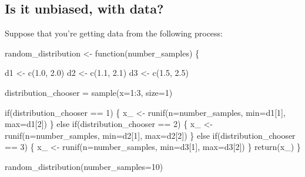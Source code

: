 \documentclass[
  letterpaper,
  DIV=11,
  numbers=noendperiod]{scrreprt}
\newenvironment{Shaded}{\begin{snugshade}}{\end{snugshade}}
\newcommand{\AttributeTok}[1]{\textcolor[rgb]{0.40,0.45,0.13}{#1}}
\newcommand{\ControlFlowTok}[1]{\textcolor[rgb]{0.00,0.23,0.31}{#1}}
\newcommand{\DecValTok}[1]{\textcolor[rgb]{0.68,0.00,0.00}{#1}}
\newcommand{\FloatTok}[1]{\textcolor[rgb]{0.68,0.00,0.00}{#1}}
\newcommand{\FunctionTok}[1]{\textcolor[rgb]{0.28,0.35,0.67}{#1}}
\newcommand{\NormalTok}[1]{\textcolor[rgb]{0.00,0.23,0.31}{#1}}
\newcommand{\OtherTok}[1]{\textcolor[rgb]{0.00,0.23,0.31}{#1}}
\newcommand{\SpecialCharTok}[1]{\textcolor[rgb]{0.37,0.37,0.37}{#1}}
\begin{document}
\subsection{Is it unbiased, with data?}\label{is-it-unbiased-with-data}

Suppose that you're getting data from the following process:

\begin{Shaded}
\begin{Highlighting}[]
\NormalTok{random\_distribution }\OtherTok{\textless{}{-}} \ControlFlowTok{function}\NormalTok{(number\_samples) \{ }
  
\NormalTok{  d1 }\OtherTok{\textless{}{-}} \FunctionTok{c}\NormalTok{(}\FloatTok{1.0}\NormalTok{, }\FloatTok{2.0}\NormalTok{)}
\NormalTok{  d2 }\OtherTok{\textless{}{-}} \FunctionTok{c}\NormalTok{(}\FloatTok{1.1}\NormalTok{, }\FloatTok{2.1}\NormalTok{)}
\NormalTok{  d3 }\OtherTok{\textless{}{-}} \FunctionTok{c}\NormalTok{(}\FloatTok{1.5}\NormalTok{, }\FloatTok{2.5}\NormalTok{)}

\NormalTok{  distribution\_chooser }\OtherTok{=} \FunctionTok{sample}\NormalTok{(}\AttributeTok{x=}\DecValTok{1}\SpecialCharTok{:}\DecValTok{3}\NormalTok{, }\AttributeTok{size=}\DecValTok{1}\NormalTok{)}
  
  \ControlFlowTok{if}\NormalTok{(distribution\_chooser }\SpecialCharTok{==} \DecValTok{1}\NormalTok{) \{ }
\NormalTok{    x\_ }\OtherTok{\textless{}{-}} \FunctionTok{runif}\NormalTok{(}\AttributeTok{n=}\NormalTok{number\_samples, }\AttributeTok{min=}\NormalTok{d1[}\DecValTok{1}\NormalTok{], }\AttributeTok{max=}\NormalTok{d1[}\DecValTok{2}\NormalTok{])  }
\NormalTok{  \} }\ControlFlowTok{else} \ControlFlowTok{if}\NormalTok{(distribution\_chooser }\SpecialCharTok{==} \DecValTok{2}\NormalTok{) \{ }
\NormalTok{    x\_ }\OtherTok{\textless{}{-}} \FunctionTok{runif}\NormalTok{(}\AttributeTok{n=}\NormalTok{number\_samples, }\AttributeTok{min=}\NormalTok{d2[}\DecValTok{1}\NormalTok{], }\AttributeTok{max=}\NormalTok{d2[}\DecValTok{2}\NormalTok{]) }
\NormalTok{  \} }\ControlFlowTok{else} \ControlFlowTok{if}\NormalTok{(distribution\_chooser }\SpecialCharTok{==} \DecValTok{3}\NormalTok{) \{ }
\NormalTok{    x\_ }\OtherTok{\textless{}{-}} \FunctionTok{runif}\NormalTok{(}\AttributeTok{n=}\NormalTok{number\_samples, }\AttributeTok{min=}\NormalTok{d3[}\DecValTok{1}\NormalTok{], }\AttributeTok{max=}\NormalTok{d3[}\DecValTok{2}\NormalTok{])}
\NormalTok{  \}}
  \FunctionTok{return}\NormalTok{(x\_)}
\NormalTok{\}}

\FunctionTok{random\_distribution}\NormalTok{(}\AttributeTok{number\_samples=}\DecValTok{10}\NormalTok{)}
\end{Highlighting}
\end{Shaded}
\end{document}
